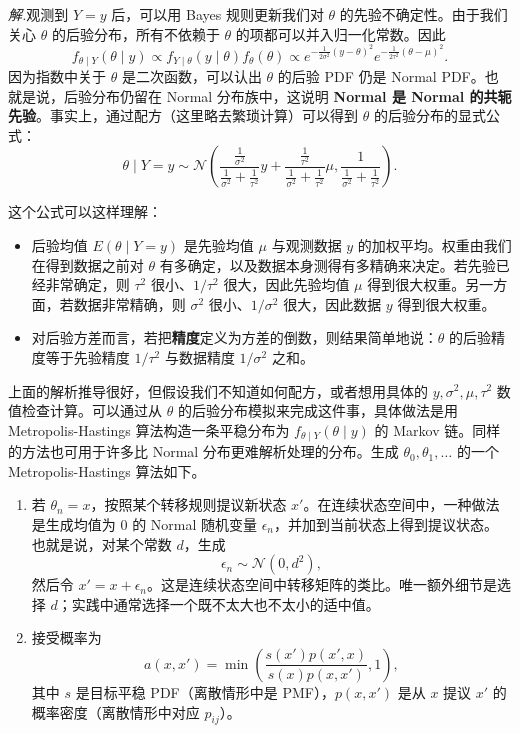 \documentclass[UTF8, 12pt, fontset=fandol, oneside]{ctexart}
\begin{document}
\noindent\textit{解.}\quad 观测到 $Y=y$ 后，可以用 Bayes 规则更新我们对 $\theta$ 的先验不确定性。由于我们关心 $\theta$ 的后验分布，所有不依赖于 $\theta$ 的项都可以并入归一化常数。因此
\[
  f_{\theta\mid Y}(\theta\mid y)
  \propto
  f_{Y\mid\theta}(y\mid\theta)f_\theta(\theta)
  \propto
  e^{-\frac{1}{2\sigma^2}(y-\theta)^2}
  e^{-\frac{1}{2\tau^2}(\theta-\mu)^2}.
\]
因为指数中关于 $\theta$ 是二次函数，可以认出 $\theta$ 的后验 PDF 仍是 Normal PDF。也就是说，后验分布仍留在 Normal 分布族中，这说明 \textbf{Normal 是 Normal 的共轭先验}。事实上，通过配方（这里略去繁琐计算）可以得到 $\theta$ 的后验分布的显式公式：
\[
  \theta\mid Y=y
  \sim
  \mathcal N\left(
    \frac{\frac{1}{\sigma^2}}{\frac{1}{\sigma^2}+\frac{1}{\tau^2}}y
    +
    \frac{\frac{1}{\tau^2}}{\frac{1}{\sigma^2}+\frac{1}{\tau^2}}\mu,
    \frac{1}{\frac{1}{\sigma^2}+\frac{1}{\tau^2}}
  \right).
\]

这个公式可以这样理解：
\begin{itemize}
  \item 后验均值 $E(\theta\mid Y=y)$ 是先验均值 $\mu$ 与观测数据 $y$ 的加权平均。权重由我们在得到数据之前对 $\theta$ 有多确定，以及数据本身测得有多精确来决定。若先验已经非常确定，则 $\tau^2$ 很小、$1/\tau^2$ 很大，因此先验均值 $\mu$ 得到很大权重。另一方面，若数据非常精确，则 $\sigma^2$ 很小、$1/\sigma^2$ 很大，因此数据 $y$ 得到很大权重。
  \item 对后验方差而言，若把\textbf{精度}定义为方差的倒数，则结果简单地说：$\theta$ 的后验精度等于先验精度 $1/\tau^2$ 与数据精度 $1/\sigma^2$ 之和。
\end{itemize}

上面的解析推导很好，但假设我们不知道如何配方，或者想用具体的 $y,\sigma^2,\mu,\tau^2$ 数值检查计算。可以通过从 $\theta$ 的后验分布模拟来完成这件事，具体做法是用 Metropolis-Hastings 算法构造一条平稳分布为 $f_{\theta\mid Y}(\theta\mid y)$ 的 Markov 链。同样的方法也可用于许多比 Normal 分布更难解析处理的分布。生成 $\theta_0,\theta_1,\ldots$ 的一个 Metropolis-Hastings 算法如下。

\begin{enumerate}
  \item 若 $\theta_n=x$，按照某个转移规则提议新状态 $x'$。在连续状态空间中，一种做法是生成均值为 $0$ 的 Normal 随机变量 $\epsilon_n$，并加到当前状态上得到提议状态。也就是说，对某个常数 $d$，生成
  \[
    \epsilon_n\sim\mathcal N(0,d^2),
  \]
  然后令 $x'=x+\epsilon_n$。这是连续状态空间中转移矩阵的类比。唯一额外细节是选择 $d$；实践中通常选择一个既不太大也不太小的适中值。

  \item 接受概率为
  \[
    a(x,x')=\min\left(
      \frac{s(x')p(x',x)}{s(x)p(x,x')},
      1
    \right),
  \]
  其中 $s$ 是目标平稳 PDF（离散情形中是 PMF），$p(x,x')$ 是从 $x$ 提议 $x'$ 的概率密度（离散情形中对应 $p_{ij}$）。
\end{enumerate}
\end{document}
